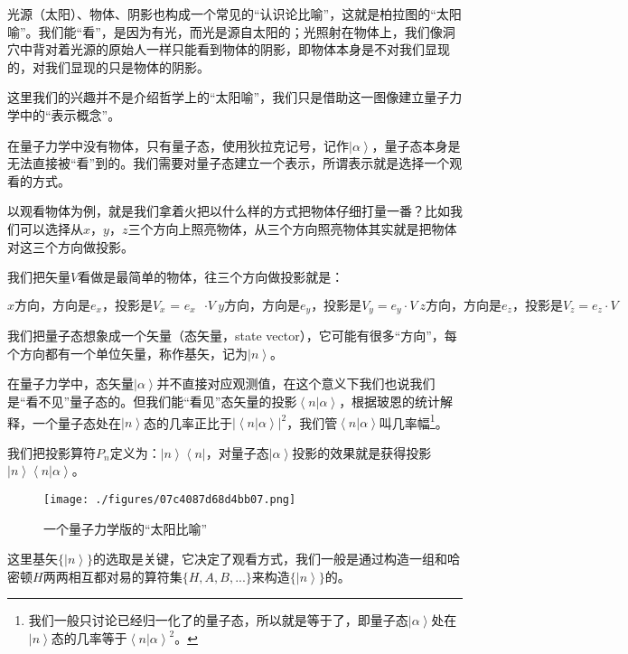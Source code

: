 光源（太阳）、物体、阴影也构成一个常见的“认识论比喻”，这就是柏拉图的“太阳喻”。我们能“看”，是因为有光，而光是源自太阳的；光照射在物体上，我们像洞穴中背对着光源的原始人一样只能看到物体的阴影，即物体本身是不对我们显现的，对我们显现的只是物体的阴影。

这里我们的兴趣并不是介绍哲学上的“太阳喻”，我们只是借助这一图像建立量子力学中的“表示概念”。

在量子力学中没有物体，只有量子态，使用狄拉克记号，记作$\left| \alpha \right\rangle$，量子态本身是无法直接被“看”到的。我们需要对量子态建立一个表示，所谓表示就是选择一个观看的方式。

以观看物体为例，就是我们拿着火把以什么样的方式把物体仔细打量一番？比如我们可以选择从$x$，$y$，$z$三个方向上照亮物体，从三个方向照亮物体其实就是把物体对这三个方向做投影。

我们把矢量$V$看做是最简单的物体，往三个方向做投影就是：

\begin{equation}
\text{$x$方向，方向是$e_x$，投影是$V_x$ = $e_x$ $\cdot V$}~
\text{$y$方向，方向是$e_y$，投影是$V_y = e_y \cdot V$}~
\text{$z$方向，方向是$e_z$，投影是$V_z = e_z \cdot V$}~
\end{equation}

我们把量子态想象成一个矢量（态矢量，state vector），它可能有很多“方向”，每个方向都有一个单位矢量，称作基矢，记为$\left| n \right\rangle$。

在量子力学中，态矢量$\left| \alpha \right\rangle $并不直接对应观测值，在这个意义下我们也说我们是“看不见”量子态的。但我们能“看见”态矢量的投影$\left\langle n | \alpha \right\rangle $，根据玻恩的统计解释，一个量子态处在$\left| n \right\rangle$态的几率正比于$\left|  \left\langle n | \alpha \right\rangle  \right|^2 $，我们管$\left\langle n | \alpha \right\rangle$叫几率幅\footnote{我们一般只讨论已经归一化了的量子态，所以就是等于了，即量子态$\left| \alpha \right\rangle$处在$\left| n \right\rangle$态的几率等于$\left\langle n | \alpha \right\rangle^2 $。}。

我们把投影算符$P_n$定义为：$\left| n \right\rangle \left\langle n \right|$，对量子态$\left| \alpha \right\rangle$投影的效果就是获得投影$\left| n \right\rangle \left\langle n | \alpha \right\rangle$。

\begin{figure}[ht]
\centering
\texttt{[image: ./figures/07c4087d68d4bb07.png]}
\caption{ ⼀个量⼦⼒学版的“太阳比喻”} \label{fig_QMPre3_6}
\end{figure}

这里基矢$\{ \left| n \right\rangle \}$的选取是关键，它决定了观看方式，我们一般是通过构造一组和哈密顿$H$两两相互都对易的算符集$\{  H, A, B, ...  \}$来构造$\{ \left| n \right\rangle \}$的。

